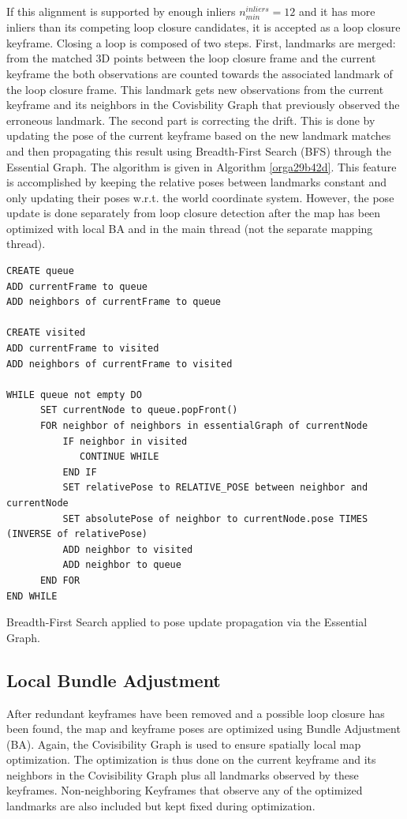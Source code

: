 \documentclass[a4paper, 10pt]{article}
\begin{document}
If this alignment is supported by enough inliers \(n_{min}^{inliers}=12\) and it has more inliers than its competing loop closure candidates, it is accepted as a loop closure keyframe.
Closing a loop is composed of two steps. First, landmarks are merged: from the matched 3D points between the loop closure frame and the current keyframe the both observations are 
counted towards the associated landmark of the loop closure frame. This landmark gets new observations from the current keyframe and its neighbors in the Covisbility Graph that previously observed the erroneous landmark. 
The second part is correcting the drift. This is done by updating the pose of the current keyframe based on the new landmark matches and then propagating this result using Breadth-First Search (BFS) \cite{bfs} through the Essential Graph. 
The algorithm is given in Algorithm \ref{orga29b42d}. This feature is accomplished by keeping the relative poses between landmarks constant and only updating their poses w.r.t. the world coordinate system.
However, the pose update is done separately from loop closure detection after the map has been optimized with local BA and in the main thread (not the separate mapping thread).

\begin{listing}
\begin{verbatim}
CREATE queue
ADD currentFrame to queue
ADD neighbors of currentFrame to queue

CREATE visited
ADD currentFrame to visited
ADD neighbors of currentFrame to visited

WHILE queue not empty DO
      SET currentNode to queue.popFront()
      FOR neighbor of neighbors in essentialGraph of currentNode
          IF neighbor in visited
             CONTINUE WHILE
          END IF
          SET relativePose to RELATIVE_POSE between neighbor and currentNode
          SET absolutePose of neighbor to currentNode.pose TIMES (INVERSE of relativePose)
          ADD neighbor to visited
          ADD neighbor to queue
      END FOR
END WHILE

\end{verbatim}
\caption{\label{orga29b42d}
Breadth-First Search applied to pose update propagation via the Essential Graph.}
\end{listing}

\subsection{Local Bundle Adjustment}
\label{sec:org18fc06c}
After redundant keyframes have been removed and a possible loop closure has been found, the map and keyframe poses are optimized using Bundle Adjustment (BA). Again, the Covisibility Graph is used to ensure spatially local map optimization. 
The optimization is thus done on the current keyframe and its neighbors in the Covisibility Graph plus all landmarks observed by these keyframes.
Non-neighboring Keyframes that observe any of the optimized landmarks are also included but kept fixed during optimization.
\end{document}
